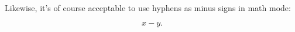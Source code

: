 \documentclass{article}
\begin{document}

Likewise, it's of course acceptable to use hyphens as minus signs in math mode: 

\[x - y.\]
\end{document}
